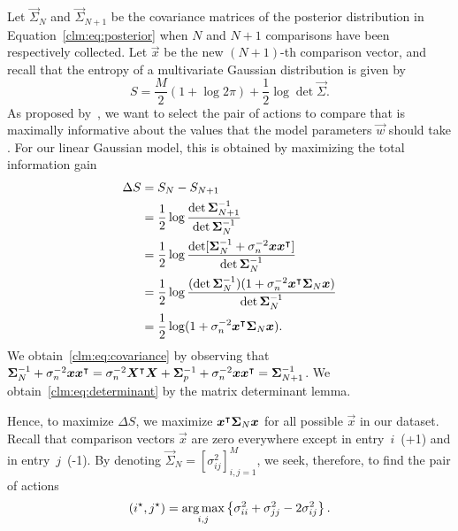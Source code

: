 Let $\vec{\Sigma}_N$ and  $\vec{\Sigma}_{N+1}$ be the covariance matrices of the posterior distribution in Equation~\eqref{clm:eq:posterior} when $N$ and $N+1$ comparisons have been respectively collected.
Let $\vec{x}$ be the new $(N+1)$-th comparison vector, and recall that the entropy of a multivariate Gaussian distribution is given by
\begin{equation}
	S = \frac{M}{2}(1 + \log 2 \pi) + \frac{1}{2} \log \det \vec{\Sigma}.
\end{equation}
As proposed by~\citet{mackay1992information}, we want to select the pair of actions to compare that is maximally informative about the values that the model parameters $\vec{w}$ should take \citep{chu2005extensions, houlsby2012collaborative}.
For our linear Gaussian model, this is obtained by maximizing the total information gain
\begin{align}
	\Delta S & = S_N - S_{N+1}  \nonumber                                                                                                                                      \\
	         & = \frac{1}{2} \log \frac{\det \bm{\Sigma}_{N+1}^{-1}}{\det \bm{\Sigma}_N^{-1}} \nonumber                                                                      \\
	         & = \frac{1}{2} \log \frac{\det [\bm{\Sigma}_N^{-1} + \sigma_n^{-2}\bm{x}\bm{x}^\intercal] }{\det \bm{\Sigma}_N^{-1}} \label{clm:eq:covariance}                      \\
	         & = \frac{1}{2} \log \frac{(\det \bm{\Sigma}_N^{-1})(1 + \sigma_n^{-2} \bm{x}^\intercal \bm{\Sigma}_N \bm{x} )}{\det \bm{\Sigma}_N^{-1}} \label{clm:eq:determinant} \\
	         & = \frac{1}{2} \log (1 + \sigma_n^{-2} \bm{x}^\intercal \bm{\Sigma}_N \bm{x}). \nonumber
\end{align}
We obtain~\eqref{clm:eq:covariance} by observing that $ \bm{\Sigma}_N^{-1} + \sigma_n^{-2} \bm{x} \bm{x}^\intercal = \sigma_n^{-2} \bm{X}^\intercal \bm{X} + \bm{\Sigma}_p^{-1} + \sigma_n^{-2} \bm{x} \bm{x}^\intercal = \bm{\Sigma}_{N+1}^{-1}$.
We obtain~\eqref{clm:eq:determinant} by the matrix determinant lemma.

Hence, to maximize $\Delta S$, we maximize $ \bm{x}^\intercal \bm{\Sigma}_N \bm{x} $ for all possible $ \vec{x} $ in our dataset.
Recall that comparison vectors $ \vec{x} $ are zero everywhere except in entry~$i$~(+1) and in entry~$j$~(-1).
By denoting $\vec{\Sigma}_N = [\sigma_{ij}^2]_{i, j = 1}^M$, we seek, therefore, to find the pair of actions
\begin{equation*}
	(i^\star, j^\star) = \operatorname*{arg\,max}_{i, j} \left\{ \sigma_{ii}^2 + \sigma_{jj}^2 - 2 \sigma_{ij}^2 \right\}.
\end{equation*}

